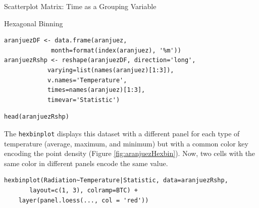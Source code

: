 \documentclass[presentation]{beamer}
\begin{document}
\begin{frame}[fragile,label=sec-1]{Scatterplot Matrix: Time as a Grouping Variable}
\begin{block}{Hexagonal Binning}

\lstset{language=R,numbers=none}
\begin{lstlisting}
aranjuezDF <- data.frame(aranjuez,
			 month=format(index(aranjuez), '%m'))
aranjuezRshp <- reshape(aranjuezDF, direction='long',
			varying=list(names(aranjuez)[1:3]),
			v.names='Temperature',
			times=names(aranjuez)[1:3],
			timevar='Statistic')
\end{lstlisting}


\lstset{language=R,numbers=none}
\begin{lstlisting}
head(aranjuezRshp)
\end{lstlisting}

The \texttt{hexbinplot} displays this dataset with a different panel for
each type of temperature (average, maximum, and minimum) but with a
common color key encoding the point density (Figure
\ref{fig:aranjuezHexbin}). Now, two cells with the same color in
different panels encode the same value. 

\lstset{language=R,numbers=none}
\begin{lstlisting}
hexbinplot(Radiation~Temperature|Statistic, data=aranjuezRshp,
	   layout=c(1, 3), colramp=BTC) +
    layer(panel.loess(..., col = 'red'))
\end{lstlisting}


\end{block}
\end{frame}
\end{document}
